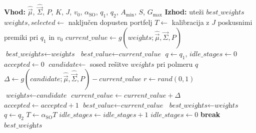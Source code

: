 \documentclass[9pt]{style/friteza}
\begin{document}
\begin{algorithm}[H]
\caption{Simulirano ohlajanje za KONP}
\label{alg:sa}
\begin{algorithmic}[1]
\State \textbf{Vhod:} $\hat{\vec{\mu}}$, $\hat{\vec{\Sigma}}$, $P$, $K$, $J$, $v_0$, $\alpha_{\mathrm{SO}}$, $q_1$, $q_2$, $A_{\min}$, $S$, $G_{\max}$
\State \textbf{Izhod:} uteži $\textit{best\_weights}$
\State $\textit{weights},\textit{selected} \leftarrow$ naključen dopusten portfelj \label{ln:sa-init}
\State $T \leftarrow$ kalibracija z $J$ poskusnimi premiki pri $q_1$ in $v_0$ \label{ln:sa-calib}
\State $\textit{current\_value} \leftarrow g(\textit{weights};\hat{\vec{\mu}},\hat{\vec{\Sigma}},P)$
\State $\textit{best\_weights} \leftarrow \textit{weights}$
\State $\textit{best\_value} \leftarrow \textit{current\_value}$
\State $q \leftarrow q_1$, \quad $\textit{idle\_stages} \leftarrow 0$
 \label{ln:sa-stage}
    \State $\textit{accepted} \leftarrow 0$
     \label{ln:sa-inner}
        \State $\textit{candidate} \leftarrow$ sosed rešitve $\textit{weights}$ pri polmeru $q$ \label{ln:sa-neigh}
        \State $\varDelta \leftarrow g(\textit{candidate};\hat{\vec{\mu}},\hat{\vec{\Sigma}},P)-\textit{current\_value}$
        \State $r \leftarrow rand(0,1)$
         \label{ln:sa-metro}
            \State $\textit{weights} \leftarrow \textit{candidate}$
            \State $\textit{current\_value} \leftarrow \textit{current\_value} + \varDelta$
            \State $\textit{accepted} \leftarrow \textit{accepted} + 1$
             \label{ln:sa-best}
                \State $\textit{best\_value} \leftarrow \textit{current\_value}$
                \State $\textit{best\_weights} \leftarrow \textit{weights}$
            \EndIf
        \EndIf
    \EndFor
     \label{ln:sa-radius}
        \State $q \leftarrow q_2$
    \EndIf
    \State $T \leftarrow \alpha_{\mathrm{SO}} T$ \label{ln:sa-cool}
     \label{ln:sa-idle}
        \State $\textit{idle\_stages} \leftarrow \textit{idle\_stages} + 1$
    \Else
        \State $\textit{idle\_stages} \leftarrow 0$
    \EndIf
     \label{ln:sa-stop}
        \State \textbf{break}
    \EndIf
\EndFor
\State \Return $\textit{best\_weights}$
\end{algorithmic}
\end{algorithm}
\end{document}
